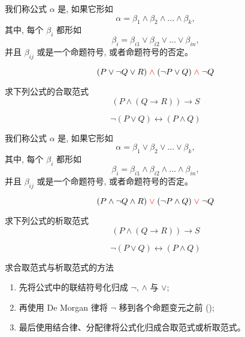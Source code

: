 \begin{frame}{}
  \begin{definition}
    我们称公式 $\alpha$ 是, 如果它形如
    \[
      \alpha = \beta_{1} \land \beta_{2} \land \dots \land \beta_{k},
    \]
    其中, 每个 $\beta_{i}$ 都形如
    \[
      \beta_{i} = \beta_{i1} \lor \beta_{i2} \lor \dots \lor \beta_{in},
    \]
    并且 $\beta_{ij}$ 或是一个命题符号, 或者命题符号的否定。
  \end{definition}

  \[
    (P \lor \lnot Q \lor R) \;\textcolor{red}{\land}\; (\lnot P \lor Q) \;\textcolor{red}{\land}\; \lnot Q
  \]
\end{frame}

\begin{frame}{}
  \begin{exampleblock}{求下列公式的合取范式}
    \[
      (P \land (Q \to R)) \to S
    \]

    \[
      \lnot (P \lor Q) \leftrightarrow (P \land Q)
    \]
  \end{exampleblock}
\end{frame}

\begin{frame}{}
  \begin{definition}
    我们称公式 $\alpha$ 是, 如果它形如
    \[
      \alpha = \beta_{1} \lor \beta_{2} \lor \dots \lor \beta_{k},
    \]
    其中, 每个 $\beta_{i}$ 都形如
    \[
      \beta_{i} = \beta_{i1} \land \beta_{i2} \land \dots \land \beta_{in},
    \]
    并且 $\beta_{ij}$ 或是一个命题符号, 或者命题符号的否定。
  \end{definition}

  \[
    (P \land \lnot Q \land R) \;\textcolor{red}{\lor}\; (\lnot P \land Q) \;\textcolor{red}{\lor}\; \lnot Q
  \]
\end{frame}

\begin{frame}{}
  \begin{exampleblock}{求下列公式的析取范式}
    \[
      (P \land (Q \to R)) \to S
    \]

    \[
      \lnot (P \lor Q) \leftrightarrow (P \land Q)
    \]
  \end{exampleblock}
\end{frame}

\begin{frame}{}
  \begin{exampleblock}{求合取范式与析取范式的方法}
    \begin{enumerate}[(1)]
      \setlength{\itemsep}{8pt}
      \item 先将公式中的联结符号化归成 $\lnot$, $\land$ 与 $\lor$;
      \item 再使用 De Morgan 律将 $\lnot$ 移到各个命题变元之前 ();
      \item 最后使用结合律、分配律将公式化归成合取范式或析取范式。
    \end{enumerate}
  \end{exampleblock}
\end{frame}
